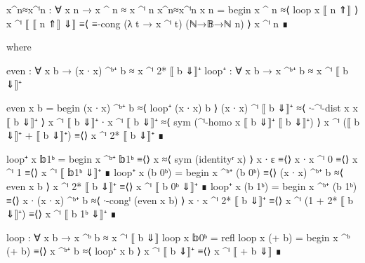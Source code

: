\documentclass[./Thesis.tex]{subfiles}
\begin{document}
\begin{code}
    x^n≈x^ⁱn : ∀ x n → x ^ n ≈ x ^ⁱ n
    x^n≈x^ⁱn x n = begin
      x ^ n ≈⟨ loop x ⟦ n ⇑⟧ ⟩
      x ^ⁱ ⟦ ⟦ n ⇑⟧ ⇓⟧ ≡⟨ ≡-cong (λ t → x ^ⁱ t) (ℕ→𝔹→ℕ n) ⟩
      x ^ⁱ n ∎
\end{code}
\begin{code}[hide]
      where
\end{code}
\begin{code}
      even : ∀ x b → (x ∙ x) ^ᵇ⁺ b ≈ x ^ⁱ 2* ⟦ b ⇓⟧⁺
      loop⁺ : ∀ x b → x ^ᵇ⁺ b ≈ x ^ⁱ ⟦ b ⇓⟧⁺
\end{code}
\begin{code}
      even x b = begin
        (x ∙ x) ^ᵇ⁺ b               ≈⟨ loop⁺ (x ∙ x) b ⟩
        (x ∙ x) ^ⁱ ⟦ b ⇓⟧⁺          ≈⟨ ∙-^ⁱ-dist x x ⟦ b ⇓⟧⁺  ⟩
        x ^ⁱ ⟦ b ⇓⟧⁺ ∙ x ^ⁱ ⟦ b ⇓⟧⁺ ≈⟨ sym (^ⁱ-homo x ⟦ b ⇓⟧⁺ ⟦ b ⇓⟧⁺) ⟩
        x ^ⁱ (⟦ b ⇓⟧⁺ + ⟦ b ⇓⟧⁺)    ≡⟨⟩
        x ^ⁱ 2* ⟦ b ⇓⟧⁺            ∎
\end{code}
\begin{code}
      loop⁺ x 𝕓1ᵇ = begin
        x ^ᵇ⁺ 𝕓1ᵇ      ≡⟨⟩
        x              ≈⟨ sym (identityʳ x) ⟩
        x ∙ ε          ≡⟨⟩
        x ∙ x ^ⁱ 0     ≡⟨⟩
        x ^ⁱ 1         ≡⟨⟩
        x ^ⁱ ⟦ 𝕓1ᵇ ⇓⟧⁺ ∎
      loop⁺ x (b 0ᵇ) = begin
        x ^ᵇ⁺ (b 0ᵇ)    ≡⟨⟩
        (x ∙ x) ^ᵇ⁺ b   ≈⟨ even x b ⟩
        x ^ⁱ 2* ⟦ b ⇓⟧⁺ ≡⟨⟩
        x ^ⁱ ⟦ b 0ᵇ ⇓⟧⁺ ∎
      loop⁺ x (b 1ᵇ) = begin
        x ^ᵇ⁺ (b 1ᵇ)          ≡⟨⟩
        x ∙ (x ∙ x) ^ᵇ⁺ b     ≈⟨ ∙-congˡ (even x b) ⟩
        x ∙ x ^ⁱ 2* ⟦ b ⇓⟧⁺   ≡⟨⟩
        x ^ⁱ (1 + 2* ⟦ b ⇓⟧⁺) ≡⟨⟩
        x ^ⁱ ⟦ b 1ᵇ ⇓⟧⁺       ∎
\end{code}
\begin{code}
      loop : ∀ x b → x ^ᵇ b ≈ x ^ⁱ ⟦ b ⇓⟧
      loop x 𝕓0ᵇ = refl
      loop x (+ b) = begin
        x ^ᵇ (+ b)    ≡⟨⟩
        x ^ᵇ⁺ b       ≈⟨ loop⁺ x b ⟩
        x ^ⁱ ⟦ b ⇓⟧⁺  ≡⟨⟩
        x ^ⁱ ⟦ + b ⇓⟧ ∎
\end{code}
\end{document}

